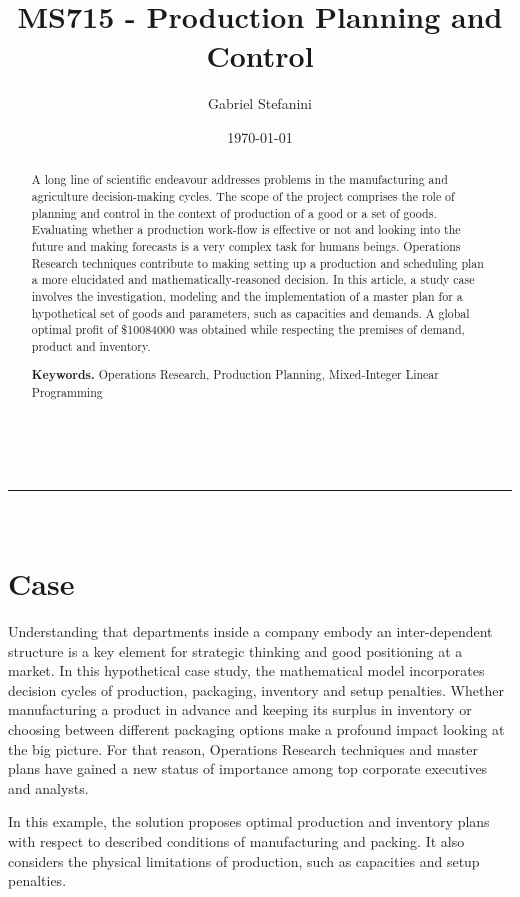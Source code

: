 \documentclass[a4paper,12pt]{article}
\makeatletter
\renewcommand{\maketitle}{
\begin{center}
\vspace{2ex}
{\normalfont \textsc{\@title}}
\vspace{1ex}
\\
\rule{\linewidth}{0.5pt}
\\
\@author \hfill \@date
\vspace{2ex}
\end{center}
}
\makeatother
\begin{document}
\title{MS715 - Production Planning and Control}

\author{Gabriel Stefanini}

\date{\today}

\maketitle

\begin{abstract}
A long line of scientific endeavour addresses problems in the manufacturing and agriculture decision-making cycles. The scope of the project comprises the role of planning and control in the context of production of a good or a set of goods. Evaluating whether a production work-flow is effective or not and looking into the future and making forecasts is a very complex task for humans beings. Operations Research techniques contribute to making setting up a production and scheduling plan a more elucidated and mathematically-reasoned decision. 
In this article, a study case involves the investigation, modeling and the implementation of a master plan for a hypothetical set of goods and parameters, such as capacities and demands. A global optimal profit of \$10084000 was obtained while respecting the premises of demand, product and inventory.

\smallskip
\noindent \textbf{Keywords.} Operations Research, Production Planning, Mixed-Integer Linear Programming

\end{abstract}

\section{Case}
Understanding that departments inside a company embody an inter-dependent structure is a key element for strategic thinking and good positioning at a market. In this hypothetical case study, the mathematical model incorporates decision cycles of production, packaging, inventory and setup penalties.
Whether manufacturing a product in advance and keeping its surplus in inventory or choosing between different packaging options make a profound impact looking at the big picture. For that reason, Operations Research techniques and master plans have gained a new status of importance among top corporate executives and analysts.

In this example, the solution proposes optimal production and inventory plans with respect to described conditions of manufacturing and packing. It also considers the physical limitations of production, such as capacities and setup penalties. 
\end{document}
